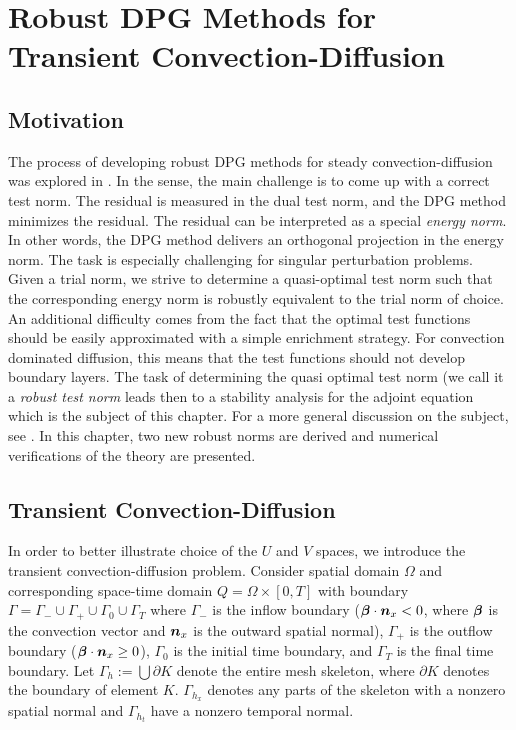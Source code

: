 \documentclass[Dissertation.tex]{subfiles}
\begin{document}
\chapter{Robust DPG Methods for Transient Convection-Diffusion}
\label{sec:robust}
\section{Motivation}
The process of developing robust DPG methods for steady convection-diffusion was explored in \cite{DemkowiczHeuer,ChanHeuerThanhDemkowicz2012}.
In the sense, the main challenge is to come up with a correct test norm. The residual is measured
in the dual test norm, and the DPG method minimizes the residual. The residual can be interpreted
as a special {\em energy norm}. In other words, the DPG method delivers an orthogonal
projection in the energy norm. The task is especially challenging for singular perturbation
problems. Given a trial norm, we strive to determine a quasi-optimal test norm such that
the corresponding energy norm is robustly equivalent to the trial  norm of choice. An additional
difficulty comes from the fact that the optimal test functions should be easily approximated
with a simple enrichment strategy. For convection dominated diffusion, this means that
the test functions should not develop boundary layers. The task of determining the
quasi optimal test norm (we call it a {\em robust test norm} leads then to a stability analysis
for the adjoint equation which is the subject of this chapter. For a more general discussion
on the subject, see \cite{DPGEncyclopedia}.
In this chapter, two new robust norms are derived and numerical verifications of the theory are presented.

\section{Transient Convection-Diffusion}
In order to better illustrate choice of the $U$ and $V$ spaces, we introduce the transient convection-diffusion problem.
Consider spatial domain $\Omega$ and corresponding space-time domain $Q=\Omega\times[0,T]$ 
with boundary $\Gamma=\Gamma_-\cup\Gamma_+\cup\Gamma_0\cup\Gamma_T$ 
where $\Gamma_-$ is the inflow boundary ($\boldsymbol\beta\cdot\boldsymbol n_x<0$, where $\boldsymbol\beta$ is the convection vector and $\boldsymbol n_x$ is the outward spatial normal),
$\Gamma_+$ is the outflow boundary ($\boldsymbol\beta\cdot\boldsymbol n_x\geq0$), $\Gamma_0$ is the initial time boundary, 
and $\Gamma_T$ is the final time boundary. Let $\Gamma_h:=\bigcup\partial K$ denote the entire mesh skeleton, 
where $\partial K$ denotes the boundary of element $K$.
$\Gamma_{h_x}$ denotes any parts of the skeleton with a nonzero spatial normal and $\Gamma_{h_t}$ have a nonzero temporal normal.
\end{document}
